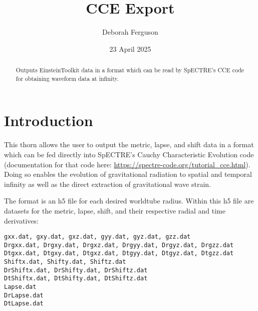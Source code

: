 \documentclass{article}
\begin{document}
\author{Deborah Ferguson}

\title{CCE Export}

\date{23 April 2025}

\maketitle



\begin{abstract}

    Outputs EinsteinToolkit data in a format which can be read by SpECTRE's CCE code for obtaining waveform data at infinity.

\end{abstract}


\section{Introduction}

This thorn allows the user to output the metric, lapse, and shift data in a format which can be fed directly into SpECTRE's
Cauchy Characteristic Evolution code (documentation for that code here: \url{https://spectre-code.org/tutorial_cce.html}).
Doing so enables the evolution of gravitational radiation to spatial and temporal infinity as well as the direct extraction
of gravitational wave strain.

The format is an h5 file for each desired worldtube radius. Within this h5 file are datasets for the metric, lapse, shift, and
their respective radial and time derivatives:

\begin{verbatim}
gxx.dat, gxy.dat, gxz.dat, gyy.dat, gyz.dat, gzz.dat
Drgxx.dat, Drgxy.dat, Drgxz.dat, Drgyy.dat, Drgyz.dat, Drgzz.dat
Dtgxx.dat, Dtgxy.dat, Dtgxz.dat, Dtgyy.dat, Dtgyz.dat, Dtgzz.dat
Shiftx.dat, Shifty.dat, Shiftz.dat
DrShiftx.dat, DrShifty.dat, DrShiftz.dat
DtShiftx.dat, DtShifty.dat, DtShiftz.dat
Lapse.dat
DrLapse.dat
DtLapse.dat
\end{verbatim}
\end{document}
